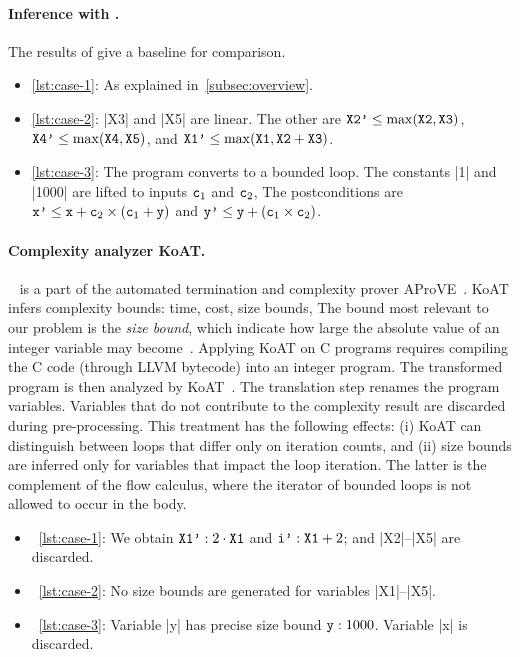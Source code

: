 \paragraph{Inference with \impl.}
The results of \impl give a baseline for comparison.

\begin{itemize}

\item \autoref{lst:case-1}: As explained in~\autoref{subsec:overview}.

\item \autoref{lst:case-2}: \pr|X3| and \pr|X5| are linear.
The other are
\(\prm{X2'}\leq\max(\prm{X2},\prm{X3})\),
\( \prm{X4'}\leq\max(\prm{X4},\prm{X5})\), and
\(\prm{X1'}\leq\max(\prm{X1},\prm{X2}+\prm{X3})\).%

\item \autoref{lst:case-3}: The program converts to a bounded loop.
The constants \pr|1| and \pr|1000| are lifted to inputs \(\prm{c}_1\) and \(\prm{c}_2\), \resp
The postconditions are \(\prm{x'}\leq\prm{x}+\prm{c}_2\times(\prm{c}_1 + \prm{y})\) and \(\prm{y'}\leq\prm{y}+(\prm{c}_1\times\prm{c}_2)\).

\end{itemize}

\paragraph{Complexity analyzer KoAT.}
~\cite{koat} is a part of the automated termination and complexity prover AProVE~\cite{giesl2016}.
KoAT infers complexity bounds: time, cost, size bounds, \etc
The bound most relevant to our problem is the \emph{size bound},
which indicate how large the absolute value of an integer variable may become~\cite{lommen2023}.
Applying KoAT on C programs requires compiling the C code (through LLVM bytecode) into an integer program.
The transformed program is then analyzed by KoAT~\cite{giesl2022}.
The translation step renames the program variables.
Variables that do not contribute to the complexity result are discarded during pre-processing.
This treatment has the following effects:
(i) KoAT can distinguish between loops that differ only on iteration counts, and
(ii) size bounds are inferred only for variables that impact the loop iteration.
The latter is the complement of the flow calculus, where the iterator of bounded loops is not allowed to occur in the body.

\begin{itemize}
\item~\autoref{lst:case-1}: We obtain \(\prm{X1'} : 2 \cdot \prm{X1}\) and \(\prm{i'}: \prm{X1}+ 2\); and \pr|X2|--\pr|X5| are discarded.

\item~\autoref{lst:case-2}: No size bounds are generated for variables \pr|X1|--\pr|X5|.

\item~\autoref{lst:case-3}: Variable \pr|y| has precise size bound \(\prm{y}: 1000\). Variable \pr|x| is discarded.
\end{itemize}


